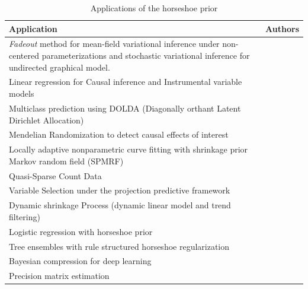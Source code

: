 \documentclass[sts,preprint]{imsart}
\begin{document}
\begin{table}[htbp]
  \centering
  \caption{Applications of the horseshoe prior}
  \footnotesize{
    \begin{tabular}{|p{3in}|p{1.5in}|}
    \hline
    Application  & Authors \bigstrut\\
    \hline
    \textit{Fadeout} method for mean-field variational inference under non-centered parameterizations and stochastic variational inference for undirected graphical model.  & \citet{ingraham_bayesian_2016} \bigstrut[t]\\
    \hline
    Linear regression for Causal inference and Instrumental variable models  & \citet{hahn_shrinkage_2014, hahn_elliptical_2016} \\
    \hline
    Multiclass prediction using DOLDA (Diagonally orthant Latent Dirichlet Allocation)  & \citet{magnusson_dolda_2016} \\
    \hline
    Mendelian Randomization to detect causal effects of interest & \citet{berzuini_mendelian_2016} \\
    \hline 
    Locally adaptive nonparametric curve fitting with shrinkage prior Markov random field (SPMRF) & \citet{faulkner_bayesian_2015} \\
    \hline
    Quasi-Sparse Count Data & \citet{datta2016bayesian} \\
    \hline
    Variable Selection under the projection predictive framework  & \citet{piironen_projection_2015} \bigstrut[b]\\
    \hline
  Dynamic shrinkage Process (dynamic linear model and trend filtering) & \citet{kowal2017dynamic} \\
   \hline 
   Logistic regression with horseshoe prior & \citet{piironen2017sparsity, wei2017bayesian} \\
  \hline  
  Tree ensembles with rule structured horseshoe regularization & \citet{nalenz2017tree} \\
 \hline 
Bayesian compression for deep learning & \citet{louizos2017bayesian} \\
 \hline 
Precision matrix estimation & \citet{li2017graphical} \bigstrut[b]\\
\hline
    \end{tabular}%
    }
  \label{tab:hs-apps}%
\end{table}%


\end{document}
